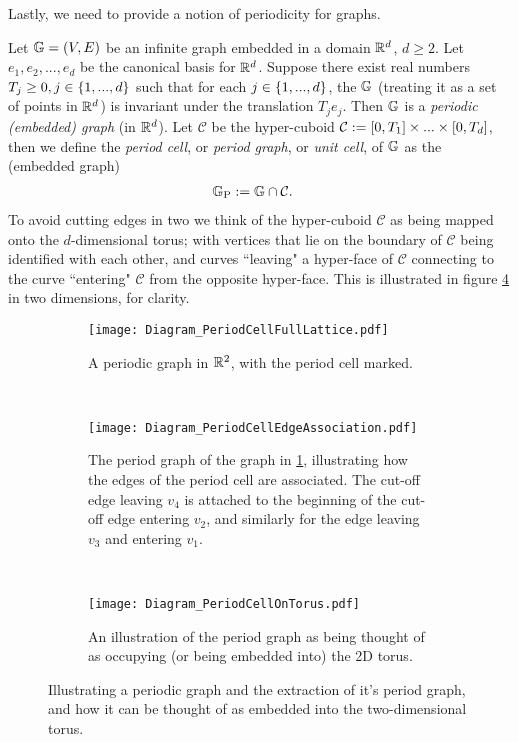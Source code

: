 Lastly, we need to provide a notion of periodicity for graphs.
\begin{definition} \label{def:PeriodicGraph}
	Let $\mathbb{G}=\left( V,E \right)$ be an infinite graph embedded in a domain $\mathbb{R}^d$, $d\geq2$.
	Let $e_1, e_2, ..., e_d$ be the canonical basis for $\mathbb{R}^d$.
	Suppose there exist real numbers $T_{j}\geq0, j\in\left\{ 1,...,d \right\}$ such that for each $j\in\left\{ 1,...,d \right\}$, the $\mathbb{G}$ (treating it as a set of points in $\mathbb{R}^d$) is invariant under the translation $T_j e_j$.
	Then $\mathbb{G}$ is a \textit{periodic (embedded) graph} (in $\mathbb{R}^d$). \newline
	Let $\mathcal{C}$ be the hyper-cuboid $\mathcal{C}:= \left[ 0,T_1 \right]\times ... \times\left[ 0,T_d \right]$, then we define the \textit{period cell}, or \textit{period graph}, or \textit{unit cell}, of $\mathbb{G}$ as the (embedded graph)
	\begin{align*}
		\mathbb{G}_{\mathrm{P}} &:= \mathbb{G} \cap \mathcal{C}.
	\end{align*}
	To avoid cutting edges in two we think of the hyper-cuboid $\mathcal{C}$ as being mapped onto the $d$-dimensional torus; with vertices that lie on the boundary of $\mathcal{C}$ being identified with each other, and curves ``leaving" a hyper-face of $\mathcal{C}$ connecting to the curve ``entering"  $\mathcal{C}$ from the opposite hyper-face.
	This is illustrated in figure \ref{fig:PeriodCellIllustration} in two dimensions, for clarity.
\end{definition}
\begin{figure}[h!]
	\centering
	\begin{subfigure}[t]{0.45\textwidth}
		\centering
		\texttt{[image: Diagram\_PeriodCellFullLattice.pdf]}
		\caption{\label{fig:Diagram_PeriodCellFullLattice} A periodic graph in $\mathbb{R}^2$, with the period cell marked.}
	\end{subfigure}
	~
	\begin{subfigure}[t]{0.45\textwidth}
		\centering
		\texttt{[image: Diagram\_PeriodCellEdgeAssociation.pdf]}
		\caption{\label{fig:Diagram_PeriodCellEdgeAssociation} The period graph of the graph in \ref{fig:Diagram_PeriodCellFullLattice}, illustrating how the edges of the period cell are associated. The cut-off edge leaving $v_4$ is attached to the beginning of the cut-off edge entering $v_2$, and similarly for the edge leaving $v_3$ and entering $v_1$.}
	\end{subfigure}
	\\
	\begin{subfigure}[b]{0.75\textwidth}
		\centering
		\texttt{[image: Diagram\_PeriodCellOnTorus.pdf]}
		\caption{\label{fig:Diagram_PeriodCellOnTorus} An illustration of the period graph as being thought of as occupying (or being embedded into) the 2D torus.}
	\end{subfigure}
	\caption{\label{fig:PeriodCellIllustration} Illustrating a periodic graph and the extraction of it's period graph, and how it can be thought of as embedded into the two-dimensional torus.}
\end{figure}

